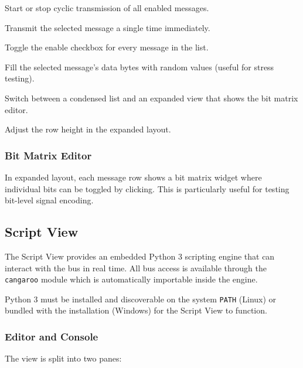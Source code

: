 \documentclass[a4paper,11pt]{article}
\begin{document}
\begin{description}[leftmargin=2em, style=nextline]
  \item[Run All / Stop All] Start or stop cyclic transmission of all enabled messages.
  \item[Send Once] Transmit the selected message a single time immediately.
  \item[Enable / Disable All] Toggle the enable checkbox for every message in the list.
  \item[Random Payload] Fill the selected message's data bytes with random values
        (useful for stress testing).
  \item[Compact / Expanded Layout] Switch between a condensed list and an expanded
        view that shows the bit matrix editor.
  \item[Zoom Slider] Adjust the row height in the expanded layout.
\end{description}

\subsubsection{Bit Matrix Editor}

In expanded layout, each message row shows a bit matrix widget where individual bits
can be toggled by clicking. This is particularly useful for testing bit-level signal
encoding.

\subsection{Script View}
\label{sec:script}

The Script View provides an embedded Python 3 scripting engine that can interact
with the bus in real time. All bus access is available through the \texttt{cangaroo}
module which is automatically importable inside the engine.

\begin{notebox}
Python 3 must be installed and discoverable on the system \texttt{PATH} (Linux) or
bundled with the installation (Windows) for the Script View to function.
\end{notebox}

\subsubsection{Editor and Console}

The view is split into two panes:
\end{document}
